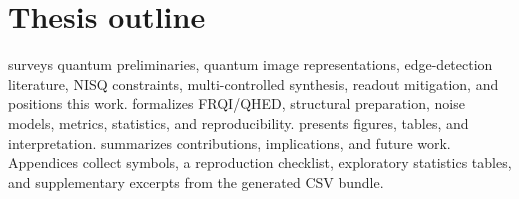 \section{Thesis outline}
 surveys quantum preliminaries, quantum image representations, edge-detection literature, NISQ constraints, multi-controlled synthesis, readout mitigation, and positions this work.  formalizes FRQI/QHED, structural preparation, noise models, metrics, statistics, and reproducibility.  presents figures, tables, and interpretation.  summarizes contributions, implications, and future work. Appendices collect symbols, a reproduction checklist, exploratory statistics tables, and supplementary excerpts from the generated CSV bundle.
